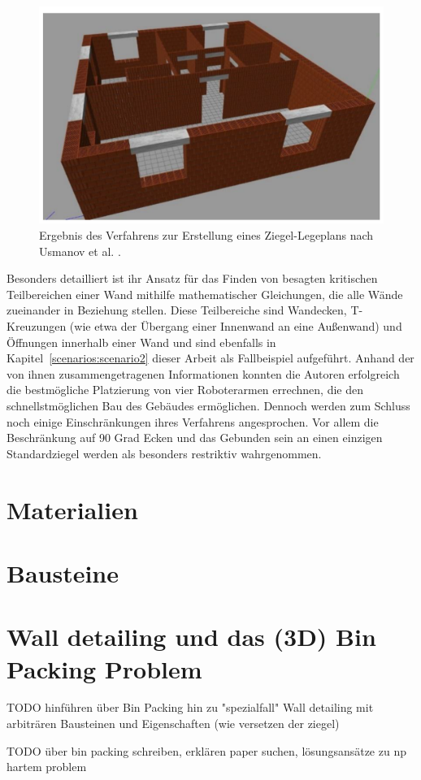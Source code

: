 \begin{figure}[ht]
    \centering
    \includegraphics[width=0.6\columnwidth]{fig/sustainability-13-03905-g004.png}
    \caption{Ergebnis des Verfahrens zur Erstellung eines Ziegel-Legeplans nach Usmanov et al. \cite{Usmanov2021}.}
    \label{fig:usmanov}
\end{figure}

Besonders detailliert ist ihr Ansatz für das Finden von besagten kritischen Teilbereichen einer Wand mithilfe mathematischer Gleichungen, die alle Wände zueinander in Beziehung stellen.
Diese Teilbereiche sind Wandecken, T-Kreuzungen (wie etwa der Übergang einer Innenwand an eine Außenwand) und Öffnungen innerhalb einer Wand und sind ebenfalls in Kapitel~\ref{scenarios:scenario2} dieser Arbeit als Fallbeispiel aufgeführt.
Anhand der von ihnen zusammengetragenen Informationen konnten die Autoren erfolgreich die bestmögliche Platzierung von vier Roboterarmen errechnen, die den schnellstmöglichen Bau des Gebäudes ermöglichen.
Dennoch werden zum Schluss noch einige Einschränkungen ihres Verfahrens angesprochen.
Vor allem die Beschränkung auf 90 Grad Ecken und das Gebunden sein an einen einzigen Standardziegel werden als besonders restriktiv wahrgenommen.

\section{Materialien}
\section{Bausteine}
\section{Wall detailing und das (3D) Bin Packing Problem}
\label{basics:wall-detailing}
TODO hinführen über Bin Packing hin zu "spezialfall" Wall detailing mit arbiträren Bausteinen und Eigenschaften (wie versetzen der ziegel)

TODO über bin packing schreiben, erklären paper suchen, lösungsansätze zu np hartem problem 

